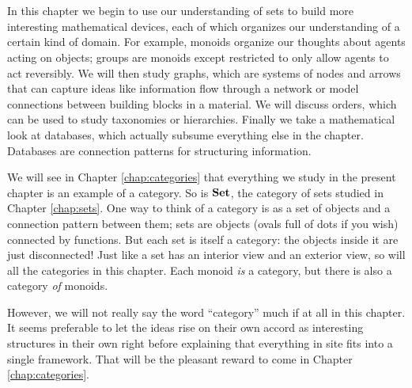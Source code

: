 \documentclass[CT4S-EN-RU]{subfiles}
\begin{document}
\chapter{}\label{chap:categories and functors without admitting it}

\begin{blockENG}
In this chapter we begin to use our understanding of sets to build more interesting mathematical devices, each of which organizes our understanding of a certain kind of domain. For example, monoids organize our thoughts about agents acting on objects; groups are monoids except restricted to only allow agents to act reversibly. We will then study graphs, which are systems of nodes and arrows that can capture ideas like information flow through a network or model connections between building blocks in a material. We will discuss orders, which can be used to study taxonomies or hierarchies. Finally we take a mathematical look at databases, which actually subsume everything else in the chapter. Databases are connection patterns for structuring information.
\end{blockENG}

\begin{blockRUS}
\end{blockRUS}

\begin{blockENG}
We will see in Chapter \ref{chap:categories} that everything we study in the present chapter is an example of a category. So is ${\bf Set}$, the category of sets studied in Chapter \ref{chap:sets}. One way to think of a category is as a set of objects and a connection pattern between them; sets are objects (ovals full of dots if you wish) connected by functions. But each set is itself a category: the objects inside it are just disconnected! Just like a set has an interior view and an exterior view, so will all the categories in this chapter. Each monoid {\em is} a category, but there is also a category {\em of} monoids. 
\end{blockENG}

\begin{blockRUS}
\end{blockRUS}

\begin{blockENG}
However, we will not really say the word “category” much if at all in this chapter. It seems preferable to let the ideas rise on their own accord as interesting structures in their own right before explaining that everything in site fits into a single framework. That will be the pleasant reward to come in Chapter \ref{chap:categories}.
\end{blockENG}
\end{document}
